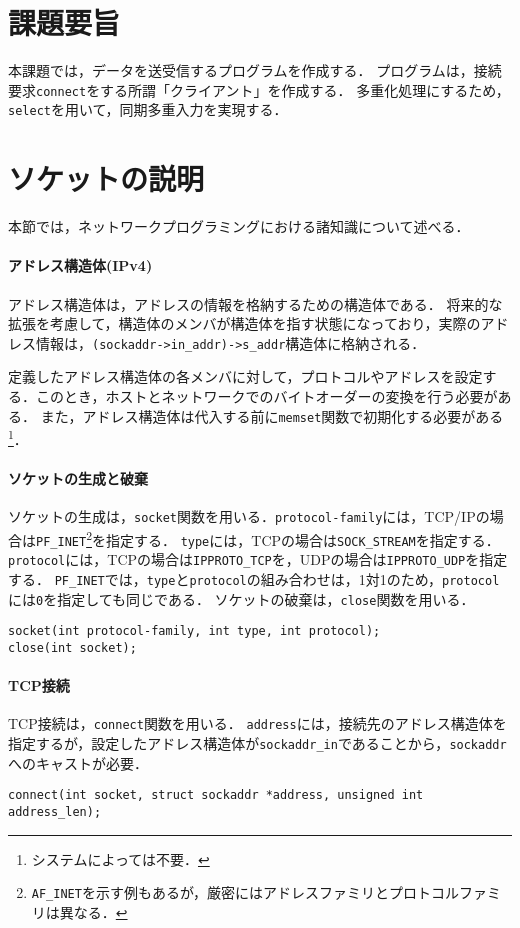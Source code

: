 \documentclass[12pt]{jlreq}
\begin{document}
\section*{課題要旨}
本課題では，データを送受信するプログラムを作成する．
プログラムは，接続要求\texttt{connect}をする所謂「クライアント」を作成する．
多重化処理にするため，\texttt{select}を用いて，同期多重入力を実現する．

\section*{ソケットの説明}
本節では，ネットワークプログラミングにおける諸知識について述べる．
\paragraph{アドレス構造体(IPv4)}
アドレス構造体は，アドレスの情報を格納するための構造体である．
将来的な拡張を考慮して，構造体のメンバが構造体を指す状態になっており，実際のアドレス情報は，\texttt{(sockaddr->in\_addr)->s\_addr}構造体に格納される．

定義したアドレス構造体の各メンバに対して，プロトコルやアドレスを設定する．このとき，ホストとネットワークでのバイトオーダーの変換を行う必要がある．
また，アドレス構造体は代入する前に\texttt{memset}関数で初期化する必要がある\footnote{システムによっては不要\cite{short}．}．
\paragraph{ソケットの生成と破棄}
ソケットの生成は，\texttt{socket}関数を用いる．\texttt{protocol-family}には，TCP/IPの場合は\texttt{PF\_INET}\footnote{\texttt{AF\_INET}を示す例もあるが，厳密にはアドレスファミリとプロトコルファミリは異なる．}を指定する．
\texttt{type}には，TCPの場合は\texttt{SOCK\_STREAM}を指定する．
\texttt{protocol}には，TCPの場合は\texttt{IPPROTO\_TCP}を，UDPの場合は\texttt{IPPROTO\_UDP}を指定する．
\texttt{PF\_INET}では，\texttt{type}と\texttt{protocol}の組み合わせは，1対1のため，\texttt{protocol}には\texttt{0}を指定しても同じである\cite{short}．
ソケットの破棄は，\texttt{close}関数を用いる．
\begin{lstlisting}[]
socket(int protocol-family, int type, int protocol);
close(int socket);
\end{lstlisting}
\paragraph{TCP接続}
TCP接続は，\texttt{connect}関数を用いる．
\texttt{address}には，接続先のアドレス構造体を指定するが，設定したアドレス構造体が\texttt{sockaddr\_in}であることから，\texttt{sockaddr}へのキャストが必要．
\begin{lstlisting}
connect(int socket, struct sockaddr *address, unsigned int address_len);
\end{lstlisting}
\end{document}
